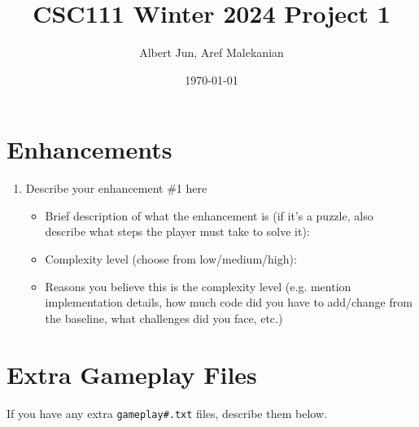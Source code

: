 \documentclass[11pt]{article}
\title{CSC111 Winter 2024 Project 1}
\author{Albert Jun, Aref Malekanian}
\date{\today}
\begin{document}
\maketitle

\section*{Enhancements}


\begin{enumerate}

\item Describe your enhancement \#1 here
	\begin{itemize}
	\item Brief description of what the enhancement is (if it's a puzzle, also describe what steps the player must take to solve it):
	\item Complexity level (choose from low/medium/high):
	\item Reasons you believe this is the complexity level (e.g. mention implementation details, how much code did you have to add/change from the baseline, what challenges did you face, etc.)
	\end{itemize}


\end{enumerate}


\section*{Extra Gameplay Files}

If you have any extra \texttt{gameplay\#.txt} files, describe them below.
\end{document}
